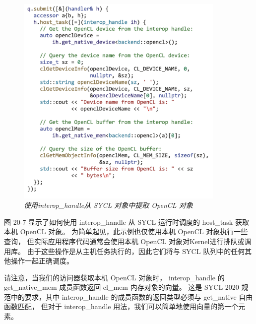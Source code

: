 \begin{figure}[H]
	\centering
	\includegraphics[width=0.9\textwidth]{figs/F20.7.png}
	\caption{\textit{使用interop\_handle从 SYCL 对象中提取 OpenCL 对象 }}
\end{figure}

图 20-7 显示了如何使用 interop\_handle 从 SYCL 运行时调度的 host\_task 获取本机 OpenCL 对象。 
为简单起见，此示例也仅使用本机 OpenCL 对象执行一些查询，
但实际应用程序代码通常会使用本机 OpenCL 对象对Kernel进行排队或调用库。 
由于这些操作是从主机任务执行的，因此它们将与 SYCL 队列中的任何其他操作一起正确调度。

请注意，当我们的访问器获取本机 OpenCL 对象时，
interop\_handle 的 get\_native\_mem 成员函数返回 cl\_mem 内存对象的向量。 
这是 SYCL 2020 规范中的要求，其中 interop\_handle 的成员函数的返回类型必须与 get\_native 自由函数匹配，
但对于 interop\_handle 用法，我们可以简单地使用向量的第一个元素。

